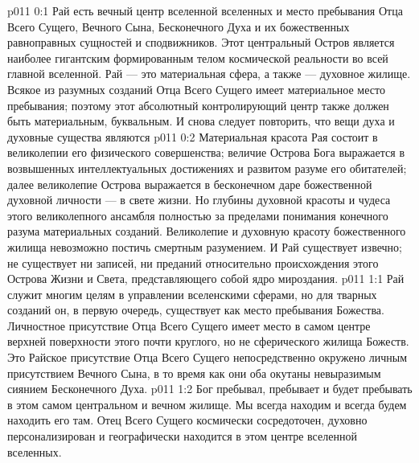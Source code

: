 \author{Совершенствователь Мудрости}
\vs p011 0:1 Рай есть вечный центр вселенной вселенных и место пребывания Отца Всего Сущего, Вечного Сына, Бесконечного Духа и их божественных равноправных сущностей и сподвижников. Этот центральный Остров является наиболее гигантским формированным телом космической реальности во всей главной вселенной. Рай --- это материальная сфера, а также --- духовное жилище. Всякое из разумных созданий Отца Всего Сущего имеет материальное место пребывания; поэтому этот абсолютный контролирующий центр также должен быть материальным, буквальным. И снова следует повторить, что вещи духа и духовные существа являются 
\vs p011 0:2 Материальная красота Рая состоит в великолепии его физического совершенства; величие Острова Бога выражается в возвышенных интеллектуальных достижениях и развитом разуме его обитателей; далее великолепие Острова выражается в бесконечном даре божественной духовной личности --- в свете жизни. Но глубины духовной красоты и чудеса этого великолепного ансамбля полностью за пределами понимания конечного разума материальных созданий. Великолепие и духовную красоту божественного жилища невозможно постичь смертным разумением. И Рай существует извечно; не существует ни записей, ни преданий относительно происхождения этого Острова Жизни и Света, представляющего собой ядро мироздания.
\vs p011 1:1 Рай служит многим целям в управлении вселенскими сферами, но для тварных созданий он, в первую очередь, существует как место пребывания Божества. Личностное присутствие Отца Всего Сущего имеет место в самом центре верхней поверхности этого почти круглого, но не сферического жилища Божеств. Это Райское присутствие Отца Всего Сущего непосредственно окружено личным присутствием Вечного Сына, в то время как они оба окутаны невыразимым сиянием Бесконечного Духа.
\enlargethispage*{-\baselineskip}%
\vs p011 1:2 Бог пребывал, пребывает и будет пребывать в этом самом центральном и вечном жилище. Мы всегда находим и всегда будем находить его там. Отец Всего Сущего космически сосредоточен, духовно персонализирован и географически находится в этом центре вселенной вселенных.
